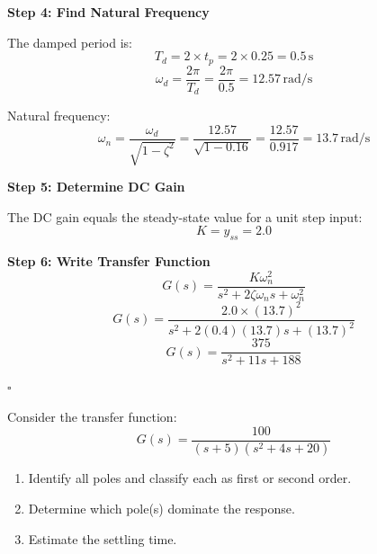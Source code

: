 \textbf{Step 4: Find Natural Frequency}

The damped period is:
\begin{equation}
T_d = 2 \times t_p = 2 \times 0.25 = 0.5\,\text{s}
\end{equation}
\begin{equation}
\omega_d = \frac{2\pi}{T_d} = \frac{2\pi}{0.5} = 12.57\,\text{rad/s}
\end{equation}

Natural frequency:
\begin{equation}
\omega_n = \frac{\omega_d}{\sqrt{1-\zeta^2}} = \frac{12.57}{\sqrt{1-0.16}} = \frac{12.57}{0.917} = 13.7\,\text{rad/s}
\end{equation}

\textbf{Step 5: Determine DC Gain}

The DC gain equals the steady-state value for a unit step input:
\begin{equation}
K = y_{ss} = 2.0
\end{equation}

\textbf{Step 6: Write Transfer Function}
\begin{equation}
G(s) = \frac{K\omega_n^2}{s^2 + 2\zeta\omega_n s + \omega_n^2}
\end{equation}
\begin{equation}
G(s) = \frac{2.0 \times (13.7)^2}{s^2 + 2(0.4)(13.7)s + (13.7)^2}
\end{equation}
\begin{equation}
\boxed{G(s) = \frac{375}{s^2 + 11s + 188}}
\end{equation}

\hfill$\square$

\begin{example}
\label{ex:higher_order}
Consider the transfer function:
\begin{equation}
G(s) = \frac{100}{(s+5)(s^2 + 4s + 20)}
\end{equation}
\begin{enumerate}[label=(\alph*)]
    \item Identify all poles and classify each as first or second order.
    \item Determine which pole(s) dominate the response.
    \item Estimate the settling time.
\end{enumerate}
\end{example}


